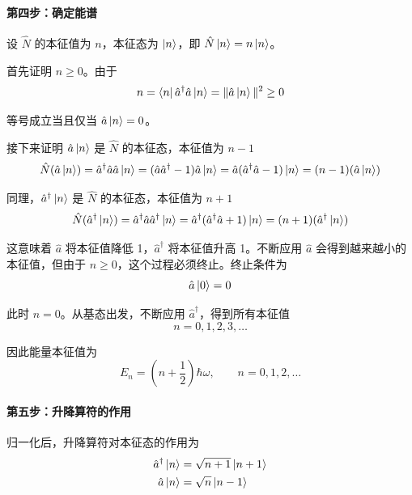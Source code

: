 \paragraph*{第四步：确定能谱}

设 $\hat{N}$ 的本征值为 $n$，本征态为 $\ket{n}$，即 $\hat{N}\ket{n} = n\ket{n}$。

首先证明 $n \geq 0$。由于
\begin{equation}
    n = \bra{n}\hat{a}^\dagger\hat{a}\ket{n} = \|\hat{a}\ket{n}\|^2 \geq 0
\end{equation}

等号成立当且仅当 $\hat{a}\ket{n} = 0$。

接下来证明 $\hat{a}\ket{n}$ 是 $\hat{N}$ 的本征态，本征值为 $n-1$
\begin{equation}
    \hat{N}(\hat{a}\ket{n}) = \hat{a}^\dagger\hat{a}\hat{a}\ket{n} = (\hat{a}\hat{a}^\dagger - 1)\hat{a}\ket{n} = \hat{a}(\hat{a}^\dagger\hat{a} - 1)\ket{n} = (n-1)(\hat{a}\ket{n})
\end{equation}

同理，$\hat{a}^\dagger\ket{n}$ 是 $\hat{N}$ 的本征态，本征值为 $n+1$
\begin{equation}
    \hat{N}(\hat{a}^\dagger\ket{n}) = \hat{a}^\dagger\hat{a}\hat{a}^\dagger\ket{n} = \hat{a}^\dagger(\hat{a}^\dagger\hat{a} + 1)\ket{n} = (n+1)(\hat{a}^\dagger\ket{n})
\end{equation}

这意味着 $\hat{a}$ 将本征值降低 1，$\hat{a}^\dagger$ 将本征值升高 1。不断应用 $\hat{a}$ 会得到越来越小的本征值，但由于 $n \geq 0$，这个过程必须终止。终止条件为
\begin{equation}
    \hat{a}\ket{0} = 0
\end{equation}

此时 $n = 0$。从基态出发，不断应用 $\hat{a}^\dagger$，得到所有本征值
\begin{equation}
    n = 0, 1, 2, 3, \ldots
\end{equation}

因此能量本征值为
\begin{equation}
    \boxed{E_n = \left(n + \frac{1}{2}\right)\hbar\omega, \qquad n = 0, 1, 2, \ldots}
\end{equation}

\paragraph*{第五步：升降算符的作用}

\begin{theorem}[升降算符对本征态的作用]
    归一化后，升降算符对本征态的作用为
    \begin{align}
        \hat{a}^\dagger\ket{n} &= \sqrt{n+1}\ket{n+1} \\
        \hat{a}\ket{n} &= \sqrt{n}\ket{n-1}
    \end{align}
\end{theorem}

